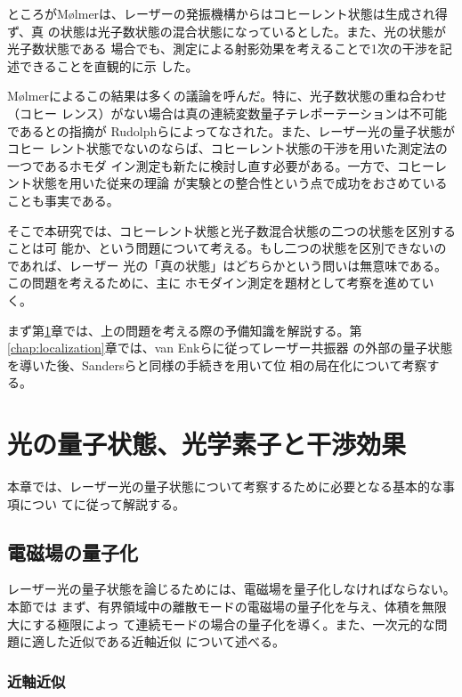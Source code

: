 \documentclass[11pt]{jsarticle}
\begin{document}
ところがM{\o}lmerは、レーザーの発振機構からはコヒーレント状態は生成され得ず、真
の状態は光子数状態の混合状態になっているとした。また、光の状態が光子数状態である
場合でも、測定による射影効果を考えることで1次の干渉を記述できることを直観的に示
した\cite{Molmer1997}。

M{\o}lmerによるこの結果は多くの議論を呼んだ。特に、光子数状態の重ね合わせ（コヒー
レンス）がない場合は真の連続変数量子テレポーテーションは不可能であるとの指摘が
Rudolphらによってなされた\cite{Rudolph2001}。また、レーザー光の量子状態がコヒー
レント状態でないのならば、コヒーレント状態の干渉を用いた測定法の一つであるホモダ
イン測定も新たに検討し直す必要がある。一方で、コヒーレント状態を用いた従来の理論
が実験との整合性という点で成功をおさめていることも事実である。

そこで本研究では、コヒーレント状態と光子数混合状態の二つの状態を区別することは可
能か、という問題について考える。もし二つの状態を区別できないのであれば、レーザー
光の「真の状態」はどちらかという問いは無意味である。この問題を考えるために、主に
ホモダイン測定を題材として考察を進めていく。

まず第\ref{chap:preparation}章では、上の問題を考える際の予備知識を解説する。第
\ref{chap:localization}章では、van Enkら\cite{vanEnk2002}に従ってレーザー共振器
の外部の量子状態を導いた後、Sandersら\cite{Sanders2003}と同様の手続きを用いて位
相の局在化について考察する。

\section{光の量子状態、光学素子と干渉効果}
\label{chap:preparation}

本章では、レーザー光の量子状態について考察するために必要となる基本的な事項につい
て\cite{Matsuoka,Leonhardt,Vogel}に従って解説する。

\subsection{電磁場の量子化}

レーザー光の量子状態を論じるためには、電磁場を量子化しなければならない。本節では
まず、有界領域中の離散モードの電磁場の量子化を与え、体積を無限大にする極限によっ
て連続モードの場合の量子化を導く。また、一次元的な問題に適した近似である近軸近似
について述べる。

\subsubsection*{近軸近似}
\label{sec:paraxial}
\end{document}
